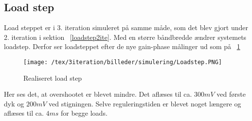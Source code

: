 \subsection{Load step}
Load steppet er i 3. iteration simuleret på samme måde, som det blev gjort under 2. iteration i sektion ~\ref{loadstep2ite}. Med en større båndbredde ændrer systemets loadstep. Derfor ser loadsteppet efter de nye gain-phase målinger ud som på ~\ref{fig:Loadstepsim2}
\begin{figure}[H]
	\center
	\texttt{[image: /tex/3iteration/billeder/simulering/Loadstep.PNG]}
	\caption{Realiseret load step}
	\label{fig:Loadstepsim2}
\end{figure} 
Her ses det, at overshootet er blevet mindre. Det aflæses til ca. $300mV$ ved første dyk og $200mV$ ved stigningen. Selve reguleringstiden er blevet noget længere og aflæses til ca. $4ms$ for begge loads. 
